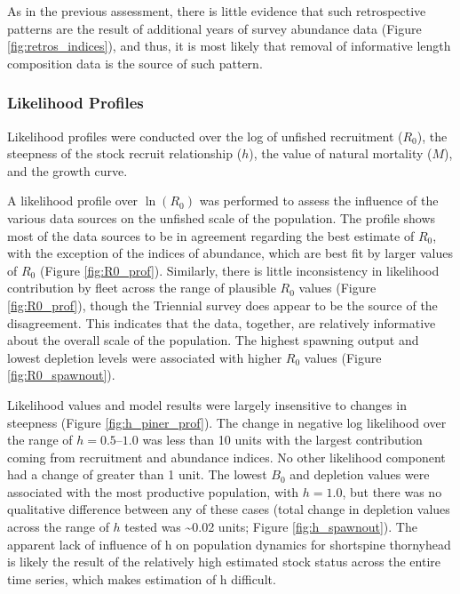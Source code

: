\documentclass[11pt,
  english,
  letterpaper,
]{article}
\begin{document}
As in the previous assessment, there is little evidence that such retrospective patterns are the result of additional years of survey abundance data (Figure \ref{fig:retros_indices}), and thus, it is most likely that removal of informative length composition data is the source of such pattern.

\hypertarget{likelihood-profiles}{%
\subsubsection{Likelihood Profiles}\label{likelihood-profiles}}

Likelihood profiles were conducted over the log of unfished recruitment (\(R_0\)), the steepness of the stock recruit relationship (\(h\)), the value of natural mortality (\(M\)), and the growth curve.

A likelihood profile over \(\ln(R_0)\) was performed to assess the influence of the various data sources on the unfished scale of the population. The profile shows most of the data sources to be in agreement regarding the best estimate of \(R_0\), with the exception of the indices of abundance, which are best fit by larger values of \(R_0\) (Figure \ref{fig:R0_prof}). Similarly, there is little inconsistency in likelihood contribution by fleet across the range of plausible \(R_0\) values (Figure \ref{fig:R0_prof}), though the Triennial survey does appear to be the source of the disagreement. This indicates that the data, together, are relatively informative about the overall scale of the population. The highest spawning output and lowest depletion levels were associated with higher \(R_0\) values (Figure \ref{fig:R0_spawnout}).

Likelihood values and model results were largely insensitive to changes in steepness (Figure \ref{fig:h_piner_prof}). The change in negative log likelihood over the range of \(h = 0.5–1.0\) was less than 10 units with the largest contribution coming from recruitment and abundance indices. No other likelihood component had a change of greater than 1 unit. The lowest \(B_0\) and depletion values were associated with the most productive population, with \(h = 1.0\), but there was no qualitative difference between any of these cases (total change in depletion values across the range of \(h\) tested was \textasciitilde0.02 units; Figure \ref{fig:h_spawnout}). The apparent lack of influence of h on population dynamics for shortspine thornyhead is likely the result of the relatively high estimated stock status across the entire time series, which makes estimation of h difficult.
\end{document}
